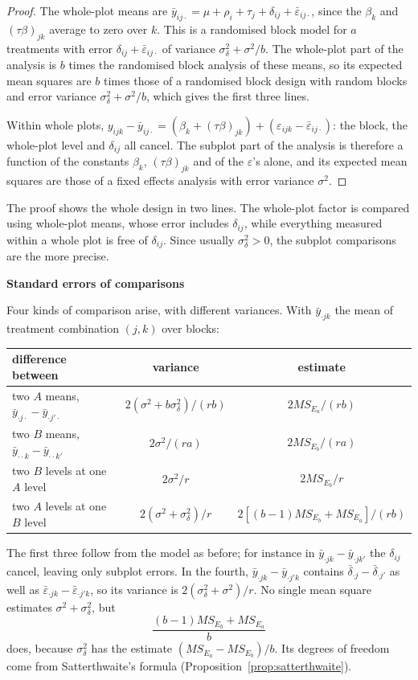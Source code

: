 \documentclass[11pt,a4paper]{article}
\numberwithin{equation}{section}
\theoremstyle{definition}
\newcommand{\subhead}[1]{%
  \par\medskip\noindent\textbf{#1}\par\nobreak\smallskip}
\begin{document}
\begin{proof}
The whole-plot means are $\bar y_{ij\cdot} = \mu + \rho_i + \tau_j + \delta_{ij} + \bar\varepsilon_{ij\cdot}$, since the $\beta_k$ and $(\tau\beta)_{jk}$ average to zero over $k$. This is a randomised block model for $a$
treatments with error $\delta_{ij} + \bar\varepsilon_{ij\cdot}$ of variance $\sigma^2_\delta + \sigma^2/b$. The whole-plot part of the analysis is $b$ times the randomised block analysis of these
means, so its expected mean squares are $b$ times those of a randomised block design with random blocks and error variance $\sigma^2_\delta + \sigma^2/b$, which gives the first
three lines.

Within whole plots, $y_{ijk} - \bar y_{ij\cdot} = (\beta_k + (\tau\beta)_{jk}) + (\varepsilon_{ijk} - \bar\varepsilon_{ij\cdot})$: the block, the whole-plot level and $\delta_{ij}$ all cancel. The subplot part of the
analysis is therefore a function of the constants $\beta_k$, $(\tau\beta)_{jk}$ and of the $\varepsilon$'s alone, and its expected mean squares are those of a fixed effects analysis with
error variance $\sigma^2$.
\end{proof}

The proof shows the whole design in two lines. The whole-plot factor is compared using whole-plot means, whose error includes $\delta_{ij}$, while
everything measured within a whole plot is free of $\delta_{ij}$. Since usually $\sigma^2_\delta > 0$, the subplot comparisons are the more precise.

\subhead{Standard errors of comparisons}
Four kinds of comparison arise, with different variances. With $\bar y_{\cdot jk}$ the mean of treatment combination $(j, k)$ over blocks:
\begin{center}
\begin{tabular}{l|c|c}
difference between & variance & estimate \\
\hline
two $A$ means, $\bar y_{\cdot j\cdot} - \bar y_{\cdot j'\cdot}$ & $2(\sigma^2 + b\sigma^2_\delta)/(rb)$ & $2MS_{E_a}/(rb)$ \\
two $B$ means, $\bar y_{\cdot\cdot k} - \bar y_{\cdot\cdot k'}$ & $2\sigma^2/(ra)$ & $2MS_{E_b}/(ra)$ \\
two $B$ levels at one $A$ level & $2\sigma^2/r$ & $2MS_{E_b}/r$ \\
two $A$ levels at one $B$ level & $2(\sigma^2 + \sigma^2_\delta)/r$ & $2[(b - 1)MS_{E_b} + MS_{E_a}]/(rb)$
\end{tabular}
\end{center}
The first three follow from the model as before; for instance in $\bar y_{\cdot jk} - \bar y_{\cdot jk'}$ the $\delta_{ij}$ cancel, leaving only subplot errors. In the fourth,
$\bar y_{\cdot jk} - \bar y_{\cdot j'k}$ contains $\bar\delta_{\cdot j} - \bar\delta_{\cdot j'}$ as well as $\bar\varepsilon_{\cdot jk} - \bar\varepsilon_{\cdot j'k}$, so its variance is $2(\sigma^2_\delta + \sigma^2)/r$. No single mean square estimates $\sigma^2 + \sigma^2_\delta$, but
\[
\frac{(b - 1)MS_{E_b} + MS_{E_a}}b
\]
does, because $\sigma^2_\delta$ has the estimate $(MS_{E_a} - MS_{E_b})/b$. Its degrees of freedom come from Satterthwaite's formula
(Proposition~\ref{prop:satterthwaite}).
\end{document}
